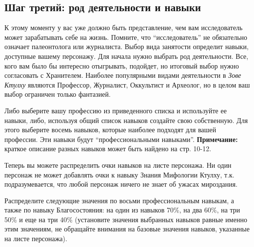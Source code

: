 \documentclass[letterpaper,twocolumn,openany, twoside, 8pt, usenames]{cocbook}
\begin{document}
\subsection*{Шаг третий: род деятельности и навыки}

К этому моменту у вас уже должно быть представление, чем вам исследователь может зарабатывать себе на жизнь. Помните, что ``исследователь'' не обязательно означает палеонтолога или журналиста. Выбор вида занятости определит навыки, доступные вашему персонажу. Для начала нужно выбрать род деятельности. Все, кого вам было бы интересно отыгрывать, подойдет, но итоговый выбор нужно согласовать с Хранителем. Наиболее популярными видами деятельности в {\it Зове Ктулху} являются Профессор, Журналист, Оккультист и Археолог, но в целом ваш выбор ограничен только фантазией.

Либо выберите вашу профессию из приведенного списка и используйте ее навыки, либо, используя общий список навыков создайте свою собственную. Для этого выберите восемь навыков, которые наиболее подходят для вашей профессии. Эти навыки будут ``профессиональными навыками''.
\smallbreak
\noindent \textbf{Примечание:} краткое описание разных навыков может быть найдено на стр. 10-12.
\smallbreak

Теперь вы можете распределить очки навыков на листе персонажа. Ни один персонаж не может добавлять очки к навыку Знания Мифологии Ктулху, т.к. подразумевается, что любой персонаж ничего не знает об ужасах мироздания.

Распределите следующие значения по восьми профессиональным навыкам, а также по навыку Благосостояния: на один из навыков 70\%, на два 60\%, на три 50\% и еще на три 40\% (установите значения выбранных навыков равные именно этим значениям, не обращайте внимания на базовые значения навыков, указанные на листе персонажа).

\smallbreak

\noindent {}
\end{document}
